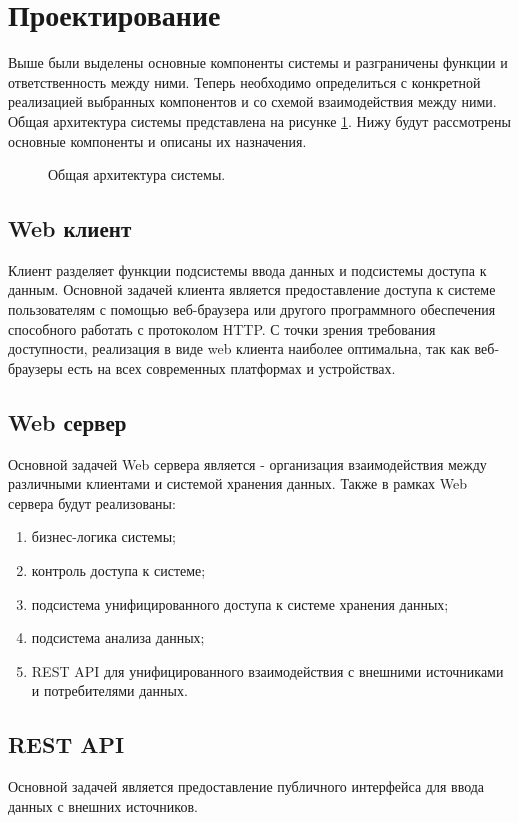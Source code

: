 \newpage
\section{Проектирование}
Выше были выделены основные компоненты системы и разграничены функции и
ответственность между ними. Теперь необходимо определиться с конкретной
реализацией выбранных компонентов и со схемой взаимодействия между ними. 
Общая архитектура системы представлена на рисунке
\ref{ris:general_architecture}. Нижу будут рассмотрены основные компоненты
и описаны их назначения.

\begin{figure}[h]
\caption{Общая архитектура системы.}
\label{ris:general_architecture}
\end{figure}

\subsection{Web клиент}
Клиент разделяет функции подсистемы ввода данных и подсистемы доступа к данным.
Основной задачей клиента является предоставление доступа к системе пользователям
с помощью веб-браузера или другого программного обеспечения способного работать
с протоколом HTTP. С точки зрения требования доступности, реализация в виде web
клиента наиболее оптимальна, так как веб-браузеры есть на всех современных
платформах и устройствах.

\subsection{Web сервер}
Основной задачей Web сервера является - организация взаимодействия между
различными клиентами и системой хранения данных. Также в рамках Web сервера
будут реализованы:
\begin{enumerate}
  \item бизнес-логика системы;
  \item контроль доступа к системе;
  \item подсистема унифицированного доступа к системе хранения данных;
  \item подсистема анализа данных;
  \item REST API для унифицированного взаимодействия с внешними источниками и
потребителями данных.
\end{enumerate}

\subsection{REST API}
Основной задачей является предоставление публичного интерфейса для ввода данных
с внешних источников.

